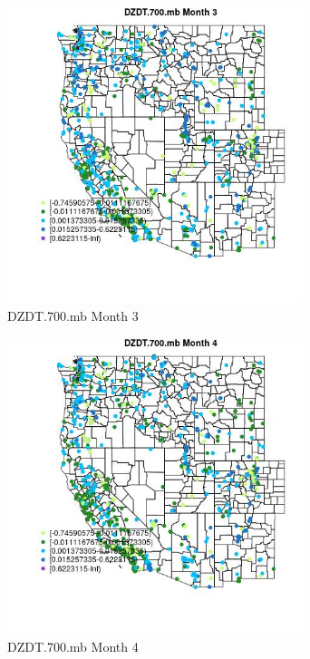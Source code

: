 \begin{figure} 
\centering  
\includegraphics[width=0.77\textwidth]{Code_Outputs/Report_ML_input_PM25_Step4_part_f_de_duplicated_aves_prioritize_24hr_obswNAs_MapObsMo3DZDT700mb.jpg} 
\caption{\label{fig:Report_ML_input_PM25_Step4_part_f_de_duplicated_aves_prioritize_24hr_obswNAsMapObsMo3DZDT700mb}DZDT.700.mb Month 3} 
\end{figure} 
 

\begin{figure} 
\centering  
\includegraphics[width=0.77\textwidth]{Code_Outputs/Report_ML_input_PM25_Step4_part_f_de_duplicated_aves_prioritize_24hr_obswNAs_MapObsMo4DZDT700mb.jpg} 
\caption{\label{fig:Report_ML_input_PM25_Step4_part_f_de_duplicated_aves_prioritize_24hr_obswNAsMapObsMo4DZDT700mb}DZDT.700.mb Month 4} 
\end{figure} 
 

